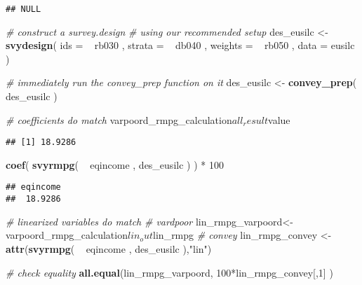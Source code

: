 \documentclass[]{book}
\newenvironment{Shaded}{\begin{snugshade}}{\end{snugshade}}
\newcommand{\KeywordTok}[1]{\textcolor[rgb]{0.13,0.29,0.53}{\textbf{{#1}}}}
\newcommand{\DataTypeTok}[1]{\textcolor[rgb]{0.13,0.29,0.53}{{#1}}}
\newcommand{\DecValTok}[1]{\textcolor[rgb]{0.00,0.00,0.81}{{#1}}}
\newcommand{\StringTok}[1]{\textcolor[rgb]{0.31,0.60,0.02}{{#1}}}
\newcommand{\CommentTok}[1]{\textcolor[rgb]{0.56,0.35,0.01}{\textit{{#1}}}}
\newcommand{\NormalTok}[1]{{#1}}
\theoremstyle{definition}
\theoremstyle{definition}
\theoremstyle{remark}
\begin{document}
\begin{verbatim}
## NULL
\end{verbatim}

\begin{Shaded}
\begin{Highlighting}[]
\CommentTok{# construct a survey.design}
\CommentTok{# using our recommended setup}
\NormalTok{des_eusilc <-}\StringTok{ }
\StringTok{    }\KeywordTok{svydesign}\NormalTok{( }
        \DataTypeTok{ids =} \NormalTok{~}\StringTok{ }\NormalTok{rb030 , }
        \DataTypeTok{strata =} \NormalTok{~}\StringTok{ }\NormalTok{db040 ,  }
        \DataTypeTok{weights =} \NormalTok{~}\StringTok{ }\NormalTok{rb050 , }
        \DataTypeTok{data =} \NormalTok{eusilc}
    \NormalTok{)}

\CommentTok{# immediately run the convey_prep function on it}
\NormalTok{des_eusilc <-}\StringTok{ }\KeywordTok{convey_prep}\NormalTok{( des_eusilc )}

\CommentTok{# coefficients do match}
\NormalTok{varpoord_rmpg_calculation$all_result$value}
\end{Highlighting}
\end{Shaded}

\begin{verbatim}
## [1] 18.9286
\end{verbatim}

\begin{Shaded}
\begin{Highlighting}[]
\KeywordTok{coef}\NormalTok{( }\KeywordTok{svyrmpg}\NormalTok{( ~}\StringTok{ }\NormalTok{eqincome , des_eusilc ) ) *}\StringTok{ }\DecValTok{100}
\end{Highlighting}
\end{Shaded}

\begin{verbatim}
## eqincome 
##  18.9286
\end{verbatim}

\begin{Shaded}
\begin{Highlighting}[]
\CommentTok{# linearized variables do match}
\CommentTok{# vardpoor}
\NormalTok{lin_rmpg_varpoord<-}\StringTok{ }\NormalTok{varpoord_rmpg_calculation$lin_out$lin_rmpg}
\CommentTok{# convey }
\NormalTok{lin_rmpg_convey <-}\StringTok{ }\KeywordTok{attr}\NormalTok{(}\KeywordTok{svyrmpg}\NormalTok{( ~}\StringTok{ }\NormalTok{eqincome , des_eusilc ),}\StringTok{"lin"}\NormalTok{)}

\CommentTok{# check equality}
\KeywordTok{all.equal}\NormalTok{(lin_rmpg_varpoord, }\DecValTok{100}\NormalTok{*lin_rmpg_convey[,}\DecValTok{1}\NormalTok{] )}
\end{Highlighting}
\end{Shaded}
\end{document}
